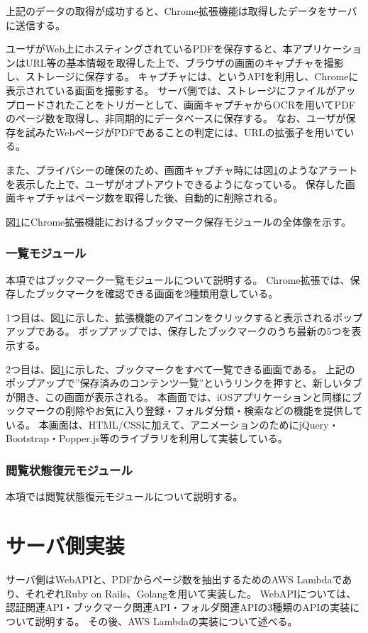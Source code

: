 上記のデータの取得が成功すると、Chrome拡張機能は取得したデータをサーバに送信する。

ユーザがWeb上にホスティングされているPDFを保存すると、本アプリケーションはURL等の基本情報を取得した上で、ブラウザの画面のキャプチャを撮影し、ストレージに保存する。
キャプチャには、というAPIを利用し、Chromeに表示されている画面を撮影する。
サーバ側では、ストレージにファイルがアップロードされたことをトリガーとして、画面キャプチャからOCRを用いてPDFのページ数を取得し、非同期的にデータベースに保存する。
なお、ユーザが保存を試みたWebページがPDFであることの判定には、URLの拡張子を用いている。

また、プライバシーの確保のため、画面キャプチャ時には図\ref{}のようなアラートを表示した上で、ユーザがオプトアウトできるようになっている。
保存した画面キャプチャはページ数を取得した後、自動的に削除される。

図\ref{}にChrome拡張機能におけるブックマーク保存モジュールの全体像を示す。

\subsubsection{一覧モジュール}
本項ではブックマーク一覧モジュールについて説明する。
Chrome拡張では、保存したブックマークを確認できる画面を2種類用意している。

1つ目は、図\ref{}に示した、拡張機能のアイコンをクリックすると表示されるポップアップである。
ポップアップでは、保存したブックマークのうち最新の5つを表示する。

2つ目は、図\ref{}に示した、ブックマークをすべて一覧できる画面である。
上記のポップアップで”保存済みのコンテンツ一覧”というリンクを押すと、新しいタブが開き、この画面が表示される。
本画面では、iOSアプリケーションと同様にブックマークの削除やお気に入り登録・フォルダ分類・検索などの機能を提供している。
本画面は、HTML/CSSに加えて、アニメーションのためにjQuery\cite{}・Bootstrap\cite{}・Popper.js\cite{}等のライブラリを利用して実装している。


\subsubsection{閲覧状態復元モジュール}
本項では閲覧状態復元モジュールについて説明する。


\section{サーバ側実装}
サーバ側はWebAPIと、PDFからページ数を抽出するためのAWS Lambdaであり、それぞれRuby on Rails、Golangを用いて実装した。
WebAPIについては、認証関連API・ブックマーク関連API・フォルダ関連APIの3種類のAPIの実装について説明する。
その後、AWS Lambdaの実装について述べる。

